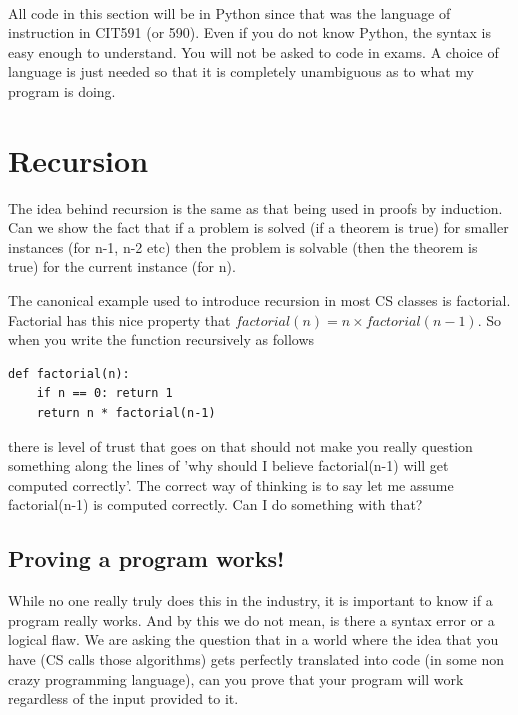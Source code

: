 \documentclass[12pt]{article}
\begin{document}
\begin{center}
\\
\vspace{1cm}
\end{center}

\vspace{0.5cm}\noindent

All code in this section will be in Python since that was the language of instruction in CIT591 (or 590). Even if you do not know Python, the syntax is easy enough to understand. You will not be asked to code in exams. A choice of language is just needed so that it is completely unambiguous as to what my program is doing.

\section*{Recursion}
The idea behind recursion is the same as that being used in proofs by induction. Can we show the fact that if a problem is solved (if a theorem is true) for smaller instances (for n-1, n-2 etc) then the problem is solvable (then the theorem is true) for the current instance (for n).

The canonical example used to introduce recursion in most CS classes is factorial. Factorial has this nice property that $factorial(n) = n \times factorial(n-1)$. So when you write the function recursively as follows

\begin{verbatim}
def factorial(n):
    if n == 0: return 1
    return n * factorial(n-1)
\end{verbatim}

there is level of trust that goes on that should not make you really question something along the lines of 'why should I believe factorial(n-1) will get computed correctly'. The correct way of thinking is to say let me assume factorial(n-1) is computed correctly. Can I do something with that?

\subsection*{Proving a program works!}

While no one really truly does this in the industry, it is important to know if a program really works. And by this we do not mean, is there a syntax error or a logical flaw. We are asking the question that in a world where the idea that you have (CS calls those algorithms) gets perfectly translated into code (in some non crazy programming language), can you prove that your program will work regardless of the input provided to it.
\end{document}
